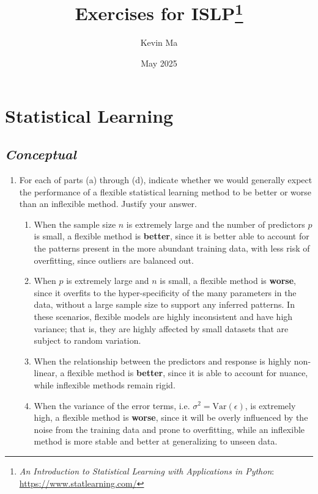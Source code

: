 \documentclass[11pt]{article}
\title{Exercises for ISLP\footnote{\textit{An Introduction to
    Statistical Learning with Applications in Python}:
\url{https://www.statlearning.com/}}}
\author{Kevin Ma}
\date{May 2025}
\begin{document}
\maketitle

\setcounter{section}{1}

\section{Statistical Learning}

\subsection*{\textit{Conceptual}}

\begin{enumerate}
  \item For each of parts (a) through (d), indicate whether we would generally
    expect the performance of a flexible statistical learning method to be
    better or worse than an inflexible method. Justify your answer.
    \begin{enumerate}
      \item When the sample size $n$ is extremely large and the
        number of predictors $p$ is small, a flexible method is
        \textbf{better}, since it is better able to account for the
        patterns present in the more abundant training data, with
        less risk of overfitting, since outliers are balanced out.
      \item When $p$ is extremely large and $n$ is small, a flexible
        method is \textbf{worse}, since it overfits to the
        hyper-specificity of the many parameters in the data, without
        a large sample size to support any inferred patterns. In
        these scenarios, flexible models are highly inconsistent and
        have high variance; that is, they are highly affected by small datasets that are subject to random variation.
      \item When the relationship between the predictors and response
        is highly non-linear, a flexible method is \textbf{better},
        since it is able to account for nuance, while inflexible
        methods remain rigid.
      \item When the variance of the error terms, i.e. $\sigma^2 =
        \text{Var}(\epsilon)$, is extremely high, a flexible method
        is \textbf{worse}, since it will be overly influenced by the
        noise from the training data and prone to overfitting, while
        an inflexible method is more stable and better at
        generalizing to unseen data.
    \end{enumerate}


\end{enumerate}
\end{document}
